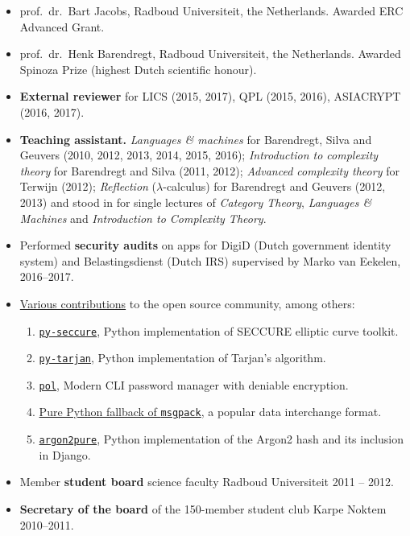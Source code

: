 \documentclass{article}
\newcommand\partitle[1]{\vskip20pt\par\noindent{\textsf{\textbf{#1}}}}
\begin{document}
\partitle{References}
\begin{itemize}
\item prof.~dr.~Bart Jacobs, Radboud Universiteit, the Netherlands.
        Awarded ERC Advanced Grant.
\item prof.~dr.~Henk Barendregt, Radboud Universiteit, the Netherlands.
    Awarded Spinoza Prize (highest Dutch scientific honour).
\end{itemize}

\partitle{Other relevant experience}
\begin{itemize}
    \item \textbf{External reviewer}
            for LICS (2015, 2017), QPL (2015, 2016), ASIACRYPT (2016, 2017).
    \item \textbf{Teaching assistant.}
        \emph{Languages \& machines} for Barendregt, Silva and Geuvers
        (2010, 2012, 2013, 2014, 2015, 2016);
        \emph{Introduction to complexity theory}
        for Barendregt and Silva (2011, 2012);
        \emph{Advanced complexity theory}
        for Terwijn (2012);
        \emph{Reflection} ($\lambda$-calculus) for Barendregt and Geuvers
        (2012, 2013) and stood in for single lectures
        of \emph{Category Theory}, \emph{Languages \& Machines}
        and \emph{Introduction to Complexity Theory}.
    \item Performed \textbf{security audits}
        on apps for DigiD (Dutch government identity system)
        and Belastingsdienst (Dutch IRS) supervised by Marko van Eekelen,
        2016--2017.
    \item \href{https://github.com/bwesterb}{Various contributions} to the open source community, among others:
        \begin{enumerate}
            \item \href{https://github.com/bwesterb/py-seccure}{\texttt{py-seccure}}, Python implementation of SECCURE elliptic curve toolkit.
            \item \href{https://github.com/bwesterb/py-tarjan}{\texttt{py-tarjan}}, Python implementation of Tarjan's algorithm.
            \item \href{https://github.com/bwesterb/pol}{\texttt{pol}}, Modern CLI password manager with deniable encryption.
            \item \href{https://github.com/msgpack/msgpack-python/pull/42}{Pure Python fallback of \texttt{msgpack}}, a popular data interchange format.
            \item \href{https://github.com/bwesterb/argon2pure}{\texttt{argon2pure}}, Python implementation of the Argon2 hash and its inclusion
                    in Django.
        \end{enumerate}
    \item Member \textbf{student board} science faculty Radboud Universiteit
        2011 -- 2012.
    \item \textbf{Secretary of the board} of the 150-member student
        club Karpe Noktem 2010--2011.
\end{itemize}
\end{document}
